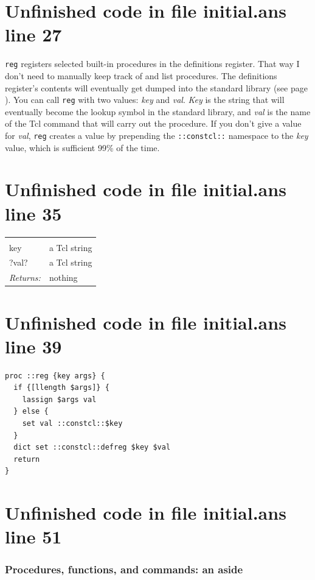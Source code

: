 \documentclass[twoside,9pt]{report}
\begin{document}
\section{Unfinished code in file initial.ans line 27}

\texttt{reg} registers selected built-in procedures in the definitions register. That way I don't need to manually keep track of and list procedures. The definitions register's contents will eventually get dumped into the standard library (see page \pageref{environment-startup}). You can call \texttt{reg} with two values: \emph{key} and \emph{val}. \emph{Key} is the string that will eventually become the lookup symbol in the standard library, and \emph{val} is the name of the Tcl command that will carry out the procedure. If you don't give a value for \emph{val}, \texttt{reg} creates a value by prepending the \texttt{::constcl::} namespace to the \emph{key} value, which is sufficient 99\% of the time.

\section{Unfinished code in file initial.ans line 35}
\noindent\begin{tabular}{ |p{1.9cm} p{8cm}| }
\hline
\rowcolor[HTML]{CCCCCC} \multicolumn{2}{|l|}{\bf reg (internal)} \\
key & a Tcl string \\
?val? & a Tcl string \\
\textit{Returns:} & nothing \\
\hline
\end{tabular}
\section{Unfinished code in file initial.ans line 39}
\begin{lstlisting}
proc ::reg {key args} {
  if {[llength $args]} {
    lassign $args val
  } else {
    set val ::constcl::$key
  }
  dict set ::constcl::defreg $key $val
  return
}
\end{lstlisting}
\section{Unfinished code in file initial.ans line 51}
\subsubsection{Procedures, functions, and commands: an aside}
\label{procedures,-functions,-and-commands-an-aside}
\end{document}
